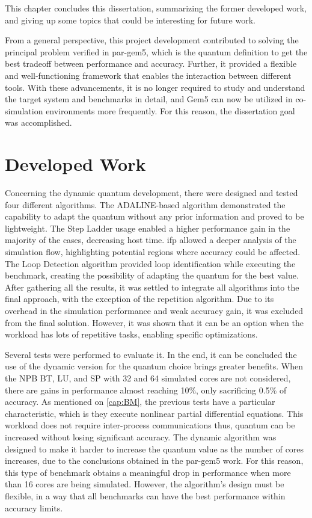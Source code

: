 

This chapter concludes this dissertation, summarizing the former developed work, and giving up some topics that could be
interesting for future work.

From a general perspective, this project development contributed to solving the principal problem verified in par-gem5, which is the 
quantum definition to get the best tradeoff between performance and accuracy. Further, it provided a flexible and well-functioning framework 
that enables the interaction between different tools. With these advancements, it is no longer required to study and understand 
the target system and benchmarks in detail, and Gem5 can now be utilized in co-simulation environments more frequently.
For this reason, the dissertation goal was accomplished. 

\section{Developed Work}

Concerning the dynamic quantum development, there were designed and tested four different algorithms. 
The ADALINE-based algorithm demonstrated the capability to adapt the quantum without any prior information and proved to be lightweight.
The Step Ladder usage enabled a higher performance gain in the majority of the cases, decreasing host time. 
\gls{ifp} allowed a deeper analysis of the simulation flow, highlighting potential regions where accuracy could be affected. 
The Loop Detection algorithm provided loop identification while executing the benchmark, creating the possibility of adapting the quantum 
for the best value. 
After gathering all the results, it was settled to integrate all algorithms into the final approach, with the exception of the repetition algorithm.
Due to its overhead in the simulation performance and weak accuracy gain, it was excluded from the final solution. However, it was shown 
that it can be an option when the workload has lots of repetitive tasks, enabling specific optimizations.

Several tests were performed to evaluate it. In the end, it can be concluded the use of the dynamic version for the quantum choice brings 
greater benefits. When the NPB BT, LU, and SP with 32 and 64 simulated cores are not considered, there are gains in performance almost 
reaching 10\%, only sacrificing 0.5\% of accuracy. As mentioned on \autoref{cap:BM}, the previous tests have a particular characteristic, 
which is they execute nonlinear partial differential equations. This workload does not require inter-process communications thus, 
quantum can be increased without losing significant accuracy. The dynamic algorithm was designed to make it harder to increase the 
quantum value as the number of cores increases, due to the conclusions obtained in the par-gem5 \cite*{pargem5} work. For this reason, 
this type of benchmark obtains a meaningful drop in performance when more than 16 cores are being simulated. However, the 
algorithm's design must be flexible, in a way that all benchmarks can have the best performance within accuracy limits.

